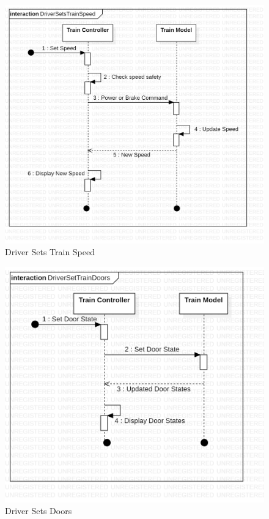 \documentclass{article}
\begin{document}
    \begin{figure}[H]
        \centering
        \includegraphics[width=\textwidth]{./System/Sequence/DriverTrainSpeed.png}
        \caption{Driver Sets Train Speed}
        \label{fig:d_train_speed_seq}
    \end{figure}
    
    \begin{figure}[H]
        \centering
        \includegraphics[width=\textwidth]{./System/Sequence/DriverDoors.png}
        \caption{Driver Sets Doors}
        \label{fig:d_door_seq}
    \end{figure}
    
\end{document}
